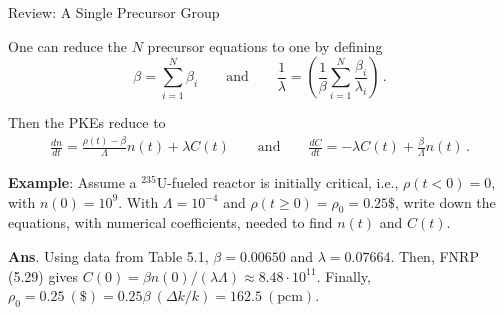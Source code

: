 \documentclass[aspectratio=1610]{beamer}
\begin{document}
\begin{frame}[fragile]{Review: A Single Precursor Group}

One can reduce the $N$ precursor equations to one by defining
\begin{equation*}
\tag{FNRP 5.31 \& 5.34}
 \beta = \sum^N_{i=1} \beta_i \qquad \text{and} \qquad 
\frac{1}{\lambda} = \left(\frac{1}{\beta} \sum_{i=1}^N \frac{\beta_i}{\lambda_i}\right) \, .
\end{equation*}

Then the PKEs reduce to
\begin{align*}
 \frac{dn}{dt} = \frac{\rho(t)-\beta}{\Lambda}n(t) + \lambda C(t) \qquad \text{and} \qquad
 \frac{dC}{dt} = -\lambda C(t) + \frac{\beta}{\Lambda} n(t) \, .
\end{align*}


\vfill 
\pause

{\bf Example}: Assume a ${}^{235}$U-fueled reactor is initially critical, i.e., $\rho(t<0)=0$, with $n(0) = 10^9$.  
With $\Lambda = 10^{-4}$ and $\rho(t\geq 0)=\rho_0=0.25\$$, write down the equations, with numerical
coefficients, needed to find $n(t)$ and $C(t)$.

\pause 
\textcolor{wcprimary}
{{\small
{\bf Ans}.  Using data from Table 5.1, $\beta = 0.00650$ and $\lambda = 0.07664$.  Then, FNRP (5.29) gives $C(0) = \beta n(0) / (\lambda \Lambda) \approx 8.48 \cdot 10^{11}$.  Finally, $\rho_0 = 0.25~(\$) = 0.25\beta~(\Delta k/k)=  162.5~(\text{pcm})$.
}}
\end{frame}

\end{document}
